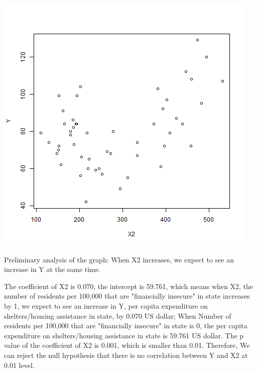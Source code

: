 \documentclass[12pt,letterpaper]{article}
\begin{document}
\begin{itemize}
 

\includegraphics[scale=.80]{Y ~ X2.png}

Preliminary analysis of the graph: When X2 increases, we expect to see an increase in Y at the same time.

The coefficient of X2 is 0.070, the intercept is 59.761, which means when X2, the number of residents per 100,000 that are "financially insecure" in state increases by 1, we expect to see an increase in Y, per capita expenditure on shelters/housing assistance in state, by 0.070 US dollar; When Number of residents per 100,000 that are "financially insecure" in state is 0, the per capita expenditure on shelters/housing assistance in state is 59.761 US dollar.
The p value of the coefficient of X2 is 0.001, which is smaller than 0.01. Therefore, We can reject the null hypothesis that there is no correlation between Y and X2 at 0.01 level.



 


\end{itemize}
\end{document}
